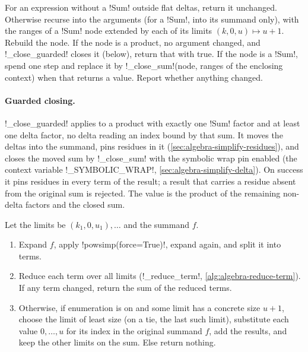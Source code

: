 \begin{algorithm}\label{alg:algebra-close-all}
For an expression without a \py!Sum! outside flat deltas, return it unchanged. Otherwise recurse into the arguments (for a \py!Sum!, into its summand only), with the ranges of a \py!Sum! node extended by each of its limits $(k,0,u)\mapsto u+1$. Rebuild the node. If the node is a product, no argument changed, and \py!_close_guarded! closes it (below), return that with true. If the node is a \py!Sum!, spend one step and replace it by \py!_close_sum!(node, ranges of the enclosing context) when that returns a value. Report whether anything changed.
\end{algorithm}

\paragraph{Guarded closing.} \py!_close_guarded! applies to a product with exactly one \py!Sum! factor and at least one delta factor, no delta reading an index bound by that sum. It moves the deltas into the summand, pins residues in it (\cref{sec:algebra-simplify-residues}), and closes the moved sum by \py!_close_sum! with the symbolic wrap pin enabled (the context variable \py!_SYMBOLIC_WRAP!, \cref{sec:algebra-simplify-delta}). On success it pins residues in every term of the result; a result that carries a residue absent from the original sum is rejected. The value is the product of the remaining non-delta factors and the closed sum.

\begin{algorithm}\label{alg:algebra-close-sum}
Let the limits be $(k_1,0,u_1),\ldots$ and the summand $f$.
\begin{enumerate}
\item Expand $f$, apply \py!powsimp(force=True)!, expand again, and split it into terms.
\item Reduce each term over all limits (\py!_reduce_term!, \cref{alg:algebra-reduce-term}). If any term changed, return the sum of the reduced terms.
\item Otherwise, if enumeration is on and some limit has a concrete size $u+1$, choose the limit of least size (on a tie, the last such limit), substitute each value $0,\ldots,u$ for its index in the original summand $f$, add the results, and keep the other limits on the sum. Else return nothing.
\end{enumerate}
\end{algorithm}

